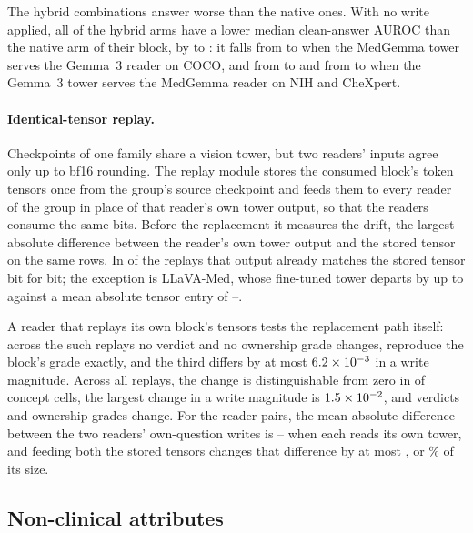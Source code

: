 \documentclass{article}
\begin{document}
The hybrid combinations answer worse than the native ones. With no write applied, all \cfSwapAnsWorse{} of the \cfSwapAnsArms{} hybrid arms have a lower median clean-answer AUROC than the native arm of their block, by \cfSwapAnsDropMin{} to \cfSwapAnsDropMax{}: it falls from \cfSwapAnsNativeGemCoco{} to \cfSwapAnsHybridGemCoco{} when the MedGemma tower serves the Gemma~3 reader on COCO, and from \cfSwapAnsNativeMedNih{} to \cfSwapAnsHybridMedNih{} and from \cfSwapAnsNativeMedChex{} to \cfSwapAnsHybridMedChex{} when the Gemma~3 tower serves the MedGemma reader on NIH and CheXpert.

\paragraph{Identical-tensor replay.} Checkpoints of one family share a vision tower, but two readers' inputs agree only up to bf16 rounding. The replay module stores the consumed block's token tensors once from the group's source checkpoint and feeds them to every reader of the group in place of that reader's own tower output, so that the readers consume the same bits. Before the replacement it measures the drift, the largest absolute difference between the reader's own tower output and the stored tensor on the same rows. In \cfReplayDriftZero{} of the \cfReplayBlocks{} replays that output already matches the stored tensor bit for bit; the exception is LLaVA-Med, whose fine-tuned tower departs by up to \cfReplayDriftMax{} against a mean absolute tensor entry of \cfReplayTensorMin{}--\cfReplayTensorMax{}.

A reader that replays its own block's tensors tests the replacement path itself: across the \cfReplaySelf{} such replays no verdict and no ownership grade changes, \cfReplaySelfExact{} reproduce the block's grade exactly, and the third differs by at most $6.2\times10^{-3}$ in a write magnitude. Across all \cfReplayBlocks{} replays, the change is distinguishable from zero in \cfReplayMoved{} of \cfReplayCells{} concept cells, the largest change in a write magnitude is $1.5\times10^{-2}$, and \cfReplayVerdictChanges{} verdicts and \cfReplayOwnedChanges{} ownership grades change. For the \cfReplayPairs{} reader pairs, the mean absolute difference between the two readers' own-question writes is \cfReplayPairOwnMin{}--\cfReplayPairOwnMax{} when each reads its own tower, and feeding both the stored tensors changes that difference by at most \cfReplayChangeMax{}, or \cfReplayRelMax\% of its size.

\subsection{Non-clinical attributes}
\label{app:cf-attributes}
\end{document}
